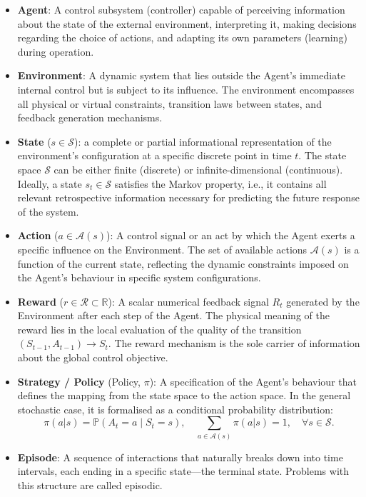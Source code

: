 \begin{itemize}

\item \textbf{Agent}: A control subsystem (controller) capable of perceiving information about the state of the external environment, interpreting it, making decisions regarding the choice of actions, and adapting its own parameters (learning) during operation.

\item \textbf{Environment}: A dynamic system that lies outside the Agent’s immediate internal control but is subject to its influence. The environment encompasses all physical or virtual constraints, transition laws between states, and feedback generation mechanisms.

\item \textbf{State} ($s \in \mathcal{S}$): a complete or partial informational representation of the environment’s configuration at a specific discrete point in time $t$. The state space $\mathcal{S}$ can be either finite (discrete) or infinite-dimensional (continuous). Ideally, a state $s_t \in \mathcal{S}$ satisfies the Markov property, i.e., it contains all relevant retrospective information necessary for predicting the future response of the system.

\item \textbf{Action} ($a \in \mathcal{A}(s)$): A control signal or an act by which the Agent exerts a specific influence on the Environment. The set of available actions $\mathcal{A}(s)$ is a function of the current state, reflecting the dynamic constraints imposed on the Agent’s behaviour in specific system configurations.

\item \textbf{Reward} ($r \in \mathcal{R} \subset \mathbb{R}$): A scalar numerical feedback signal $R_t$ generated by the Environment after each step of the Agent. The physical meaning of the reward lies in the local evaluation of the quality of the transition $(S_{t-1}, A_{t-1}) \to S_t$. The reward mechanism is the sole carrier of information about the global control objective.

\item \textbf{Strategy / Policy} (Policy, $\pi$): A specification of the Agent’s behaviour that defines the mapping from the state space to the action space. In the general stochastic case, it is formalised as a conditional probability distribution:
\[
\pi(a|s) = \mathbb{P}(A_t = a \mid S_t = s), \quad \sum_{a \in \mathcal{A}(s)} \pi(a|s) = 1, \quad \forall s \in \mathcal{S}.
\]
\item \textbf{Episode}: A sequence of interactions that naturally breaks down into time intervals, each ending in a specific state—the terminal state. Problems with this structure are called episodic.


\end{itemize}
